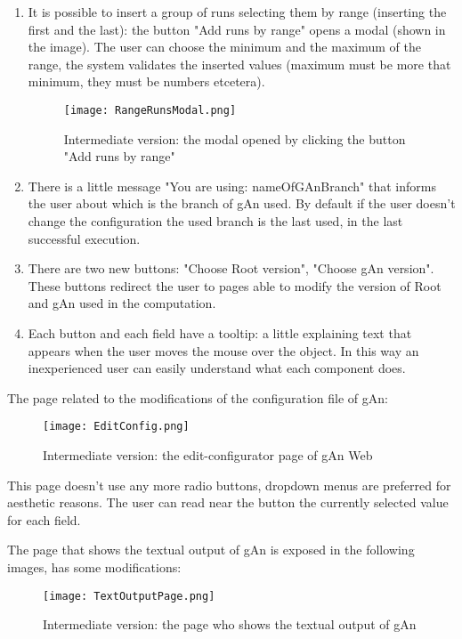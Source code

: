 \begin{enumerate}
\item It is possible to insert a group of runs selecting them by range (inserting the first and the last): the button "Add runs by range" opens a modal (shown in the image). The user can choose the minimum and the maximum of the range, the system validates the inserted values (maximum must be more that minimum, they must be numbers etcetera).

\begin{figure}[H]
\centering
\texttt{[image: RangeRunsModal.png]}  
\caption{Intermediate version: the modal opened by clicking the button "Add runs by range"}
\end{figure}

\item There is a little message "You are using: nameOfGAnBranch" that informs the user about which is the branch of gAn used. By default if the user doesn't change the configuration the used branch is the last used, in the last successful execution.

\item There are two new buttons: "Choose Root version", "Choose gAn version". These buttons redirect the user to pages able to modify the version of Root and gAn used in the computation.
 
\item Each button and each field have a tooltip: a little explaining text that appears when the user moves the mouse over the object. In this way an inexperienced user can easily understand what each component does.  

\end{enumerate}


The page related to the modifications of the configuration file of gAn:

\begin{figure}[H]
\centering
\texttt{[image: EditConfig.png]} 
\caption{Intermediate version: the edit-configurator page of gAn Web}
\end{figure}

This page doesn't use any more radio buttons, dropdown menus are preferred for aesthetic reasons. The user can read near the button the currently selected value for each field. 

\newpage

The page that shows the textual output of gAn is exposed in the following images, has some modifications:

\begin{figure}[H]
\centering
\texttt{[image: TextOutputPage.png]} 
\caption{Intermediate version: the page who shows the textual output of gAn}
\end{figure}


